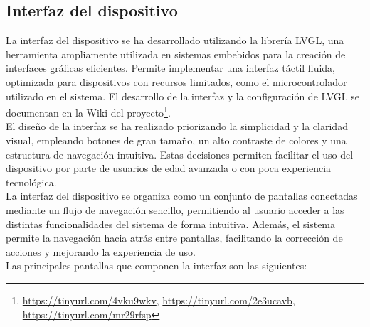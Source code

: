 \subsection{Interfaz del dispositivo}
\label{sec:interfaz_dispositivo}

La interfaz del dispositivo se ha desarrollado utilizando la librería LVGL, una herramienta ampliamente utilizada en sistemas embebidos para la creación de interfaces gráficas eficientes. Permite implementar una interfaz táctil fluida, optimizada para dispositivos con recursos limitados, como el microcontrolador utilizado en el sistema. El desarrollo de la interfaz y la configuración de LVGL se documentan en la Wiki del proyecto\footnote{
\url{https://tinyurl.com/4vku9wkv},
\url{https://tinyurl.com/2e3ucavb},
\url{https://tinyurl.com/mr29rfsp}}.\\

El diseño de la interfaz se ha realizado priorizando la simplicidad y la claridad visual, empleando botones de gran tamaño, un alto contraste de colores y una estructura de navegación intuitiva. Estas decisiones permiten facilitar el uso del dispositivo por parte de usuarios de edad avanzada o con poca experiencia tecnológica.\\

La interfaz del dispositivo se organiza como un conjunto de pantallas conectadas mediante un flujo de navegación sencillo, permitiendo al usuario acceder a las distintas funcionalidades del sistema de forma intuitiva. Además, el sistema permite la navegación hacia atrás entre pantallas, facilitando la corrección de acciones y mejorando la experiencia de uso.\\

Las principales pantallas que componen la interfaz son las siguientes:

